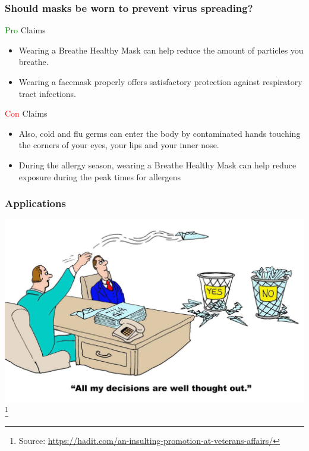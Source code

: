 \documentclass{beamer}
\newcommand{\pro}[1]{\textcolor{green}{#1}}
\newcommand{\con}[1]{\textcolor{red}{#1}}
\begin{document}
\begin{frame}
\frametitle{Should masks be worn to prevent virus spreading?}
\begin{block}{\pro{Pro} Claims}
\begin{itemize}
	\item Wearing a Breathe Healthy Mask can help reduce the amount of particles you breathe.
	\item Wearing a facemask properly offers satisfactory protection against respiratory tract infections.
\end{itemize}
\end{block}

\begin{block}{\con{Con} Claims}
\begin{itemize}
	\item Also, cold and flu germs can enter the body by contaminated hands touching the corners of your eyes, your lips and your inner nose.
	\item During the allergy season, wearing a Breathe Healthy Mask can help reduce exposure during the peak times for allergens
\end{itemize}
\end{block}

\end{frame}


\begin{frame}
\frametitle{Applications}

\includegraphics[scale=0.2]{informed_decision.jpeg}
\footnote{
\tiny{Source: \url{https://hadit.com/an-insulting-promotion-at-veterans-affairs/}}}
\end{frame}
\end{document}
